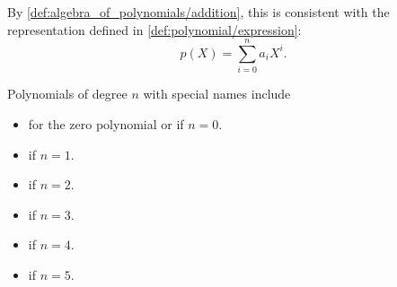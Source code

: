 \begin{definition}
\begin{defenum}
    By \cref{def:algebra_of_polynomials/addition}, this is consistent with the representation defined in \cref{def:polynomial/expression}:
    \begin{equation*}
      p(X) = \sum_{i=0}^n a_i X^i.
    \end{equation*}

     Polynomials of degree \( n \) with special names include
    \begin{itemize}
      \item {} for the zero polynomial or if \( n = 0 \).
      \item {} if \( n = 1 \).
      \item {} if \( n = 2 \).
      \item {} if \( n = 3 \).
      \item {} if \( n = 4 \).
      \item {} if \( n = 5 \).
    \end{itemize}
  \end{defenum}
\end{definition}

